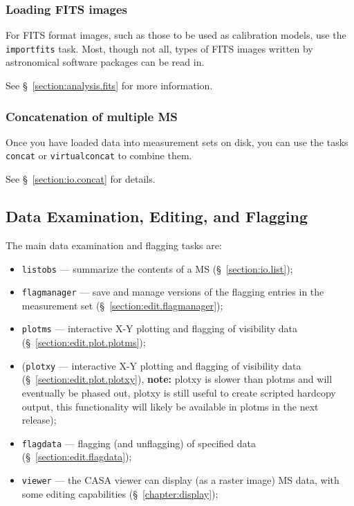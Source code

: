 \subsubsection{Loading FITS images}
\label{section:intro.walkthru.load.imfits}

For FITS format images, such as those to be used as calibration
models, use the {\tt importfits} task.  Most, though not all, types
of FITS images written by astronomical software packages can be
read in.

See \S~\ref{section:analysis.fits} for more information.

\subsubsection{Concatenation of multiple MS}
\label{section:intro.walkthru.load.concat}

Once you have loaded data into measurement sets on disk, you 
can use the tasks {\tt concat} or {\tt virtualconcat} to combine them.  

See \S~\ref{section:io.concat} for details.

\subsection{Data Examination, Editing, and Flagging} 
\label{section:intro.walkthru.flag}

The main data examination and flagging tasks are:
\begin{itemize}
   \item {\tt listobs} --- summarize the contents of a MS 
         (\S~\ref{section:io.list});
   \item {\tt flagmanager} --- save and manage versions of the
         flagging entries in the measurement set
         (\S~\ref{section:edit.flagmanager});
   \item {\tt plotms} --- interactive X-Y plotting and flagging of
         visibility data (\S~\ref{section:edit.plot.plotms});
   \item ({\tt plotxy} --- interactive X-Y plotting and flagging of
         visibility data (\S~\ref{section:edit.plot.plotxy}), {\bf
           note:} plotxy is slower than plotms and will eventually be
         phased out, plotxy is still useful to create scripted
         hardcopy output, this functionality will likely be available
         in plotms in the next release);
   \item {\tt flagdata} --- flagging (and unflagging)
         of specified data (\S~\ref{section:edit.flagdata});
   \item {\tt viewer} --- the CASA viewer can display (as a raster
         image) MS data, with some editing capabilities 
         (\S~\ref{chapter:display});
\end{itemize}

